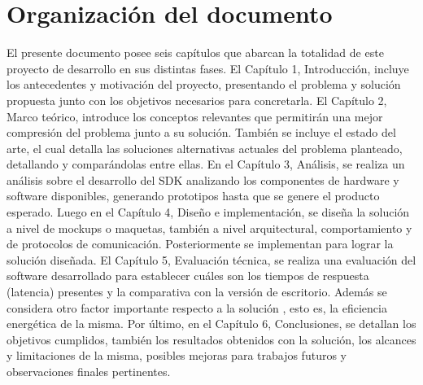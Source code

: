 \section{Organización del documento}


El presente documento posee seis capítulos que abarcan la totalidad de este proyecto de desarrollo en sus distintas fases. El Capítulo 1, Introducción, incluye los antecedentes y motivación del proyecto, presentando el problema y solución propuesta junto con los objetivos necesarios para concretarla. El Capítulo 2, Marco teórico, introduce los conceptos relevantes que permitirán una mejor compresión del problema junto a su solución. También se incluye el estado del arte, el cual detalla las soluciones alternativas actuales del problema planteado, detallando y comparándolas entre ellas. En el Capítulo 3, Análisis, se realiza un análisis sobre el desarrollo del SDK analizando los componentes de hardware y software disponibles, generando prototipos hasta que se genere el producto esperado. Luego en el Capítulo 4, Diseño e implementación, se diseña la solución a nivel de mockups  o maquetas, también a nivel arquitectural, comportamiento y de protocolos de comunicación. Posteriormente se implementan para lograr la solución diseñada. El Capítulo 5, Evaluación técnica, se realiza una evaluación del software desarrollado para establecer cuáles son los tiempos de respuesta (latencia) presentes y la comparativa con la versión de escritorio. Además se considera otro factor importante respecto a la solución , esto es, la eficiencia energética de la misma. Por último,  en el Capítulo 6, Conclusiones, se detallan los objetivos cumplidos, también los resultados obtenidos con la solución, los alcances y limitaciones de la misma, posibles mejoras para trabajos futuros y observaciones finales pertinentes.